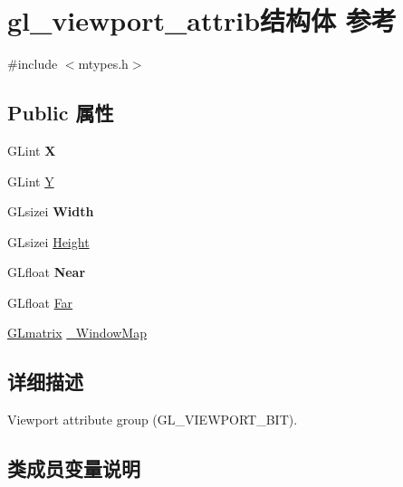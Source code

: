 \hypertarget{structgl__viewport__attrib}{}\section{gl\+\_\+viewport\+\_\+attrib结构体 参考}
\label{structgl__viewport__attrib}


{\ttfamily \#include $<$mtypes.\+h$>$}

\subsection*{Public 属性}
\begin{DoxyCompactItemize}
\item 
\mbox{\label{structgl__viewport__attrib_a273d1f8984680f47cef201be58918b35}} 
G\+Lint {\bfseries X}
\item 
G\+Lint \hyperlink{structgl__viewport__attrib_af70111dc22dd4c0d0ce66e9bdeeca1c3}{Y}
\item 
\mbox{\label{structgl__viewport__attrib_ac62b91aefaa599fe2f3ec10717bbaa35}} 
G\+Lsizei {\bfseries Width}
\item 
G\+Lsizei \hyperlink{structgl__viewport__attrib_a4579e0442567cf9f78d7538f50830afb}{Height}
\item 
\mbox{\label{structgl__viewport__attrib_a0edf4cb14b67560cde10e8a29dd50c35}} 
G\+Lfloat {\bfseries Near}
\item 
G\+Lfloat \hyperlink{structgl__viewport__attrib_a53f7a7cfe759cdcae99397a9c51fdc36}{Far}
\item 
\hyperlink{struct_g_lmatrix}{G\+Lmatrix} \hyperlink{structgl__viewport__attrib_a86dbd63a6a946a496c30bedc88ca0917}{\+\_\+\+Window\+Map}
\end{DoxyCompactItemize}


\subsection{详细描述}
Viewport attribute group (G\+L\+\_\+\+V\+I\+E\+W\+P\+O\+R\+T\+\_\+\+B\+IT). 

\subsection{类成员变量说明}
\mbox{\label{structgl__viewport__attrib_a86dbd63a6a946a496c30bedc88ca0917}} 
